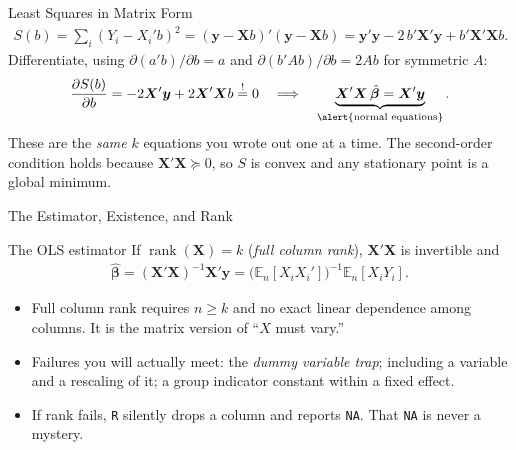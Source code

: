 \documentclass[aspectratio=169,11pt,xcolor=dvipsnames]{beamer}
\DeclareMathOperator{\rank}{rank}
\newcommand{\En}{\mathbb{E}_n}
\newcommand{\X}{\bm{X}}
\newcommand{\Y}{\bm{y}}
\newcommand{\bhat}{\hat{\bm{\beta}}}
\begin{document}
\begin{frame}{Least Squares in Matrix Form}
\begin{align*}
  S(b) = \sum_{i} (Y_i - X_i'b)^2 = (\Y-\X b)'(\Y-\X b)
       = \Y'\Y - 2\,b'\X'\Y + b'\X'\X b .
\end{align*}
\pause
Differentiate, using $\partial (a'b)/\partial b = a$ and
$\partial (b'Ab)/\partial b = 2Ab$ for symmetric $A$:
\begin{align*}
  \frac{\partial S(b)}{\partial b} = -2\X'\Y + 2\X'\X b \overset{!}{=} 0
  \quad\Longrightarrow\quad
  \underbrace{\X'\X\,\bhat = \X'\Y}_{\text{\alert{normal equations}}} .
\end{align*}
\pause
These are the \emph{same} $k$ equations you wrote out one at a time. The
second-order condition holds because $\X'\X \succeq 0$, so $S$ is convex and any
stationary point is a global minimum.
\end{frame}

\begin{frame}{The Estimator, Existence, and Rank}
\begin{block}{The OLS estimator}
If $\rank(\X)=k$ (\emph{full column rank}), $\X'\X$ is invertible and
\begin{align*}
  \bhat = (\X'\X)^{-1}\X'\Y = \big(\En[X_iX_i']\big)^{-1}\En[X_iY_i] .
\end{align*}
\end{block}
\begin{itemize}\itemsep3pt
  \item Full column rank requires $n \geq k$ and no exact linear dependence among
        columns. It is the matrix version of ``$X$ must vary.''
  \item Failures you will actually meet: the \emph{dummy variable trap}; including
        a variable and a rescaling of it; a group indicator constant within a
        fixed effect.
  \item If rank fails, \texttt{R} silently drops a column and reports \texttt{NA}.
        That \texttt{NA} is never a mystery.
\end{itemize}
\end{frame}
\end{document}
